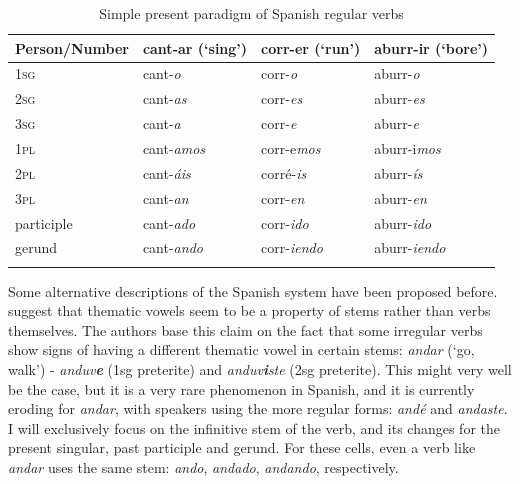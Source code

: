 \begin{table}
  \centering
  \begin{tabular}{llll}
    \lsptoprule
    Person/Number & cant-ar (`sing') & corr-er (`run')     & aburr-ir (`bore')    \\
    \midrule
    \textsc{1sg}           & cant-\textit{o}           & corr-\textit{o}     & aburr-\textit{o}     \\
    \textsc{2sg}           & cant-\textit{as}          & corr-\textit{es}    & aburr-\textit{es}    \\
    \textsc{3sg}           & cant-\textit{a}           & corr-\textit{e}     & aburr-\textit{e}     \\
    \textsc{1pl}           & cant-\textit{amos}        & corr-e\textit{mos}  & aburr-i\textit{mos}  \\
    \textsc{2pl}           & cant-\textit{áis}         & corré-\textit{is}   & aburr-\textit{ís}    \\
    \textsc{3pl}           & cant-\textit{an}          & corr-\textit{en}    & aburr-\textit{en}    \\
    participle    & cant-\textit{ado}         & corr-\textit{ido}   & aburr-\textit{ido}   \\
    gerund        & cant-\textit{ando}        & corr-\textit{iendo} & aburr-\textit{iendo} \\
    \lspbottomrule
  \end{tabular}\caption{Simple present paradigm of Spanish regular verbs}\label{tab:sp-verb-paradigm}
\end{table}

Some alternative descriptions of the Spanish system have been proposed before. \textcite{Boye.2006} suggest that thematic vowels seem to be a property of stems rather than verbs themselves. The authors base this claim on the fact that some irregular verbs show signs of having a different thematic vowel in certain stems: \textit{andar} (`go, walk') - \textit{anduv\textbf{e}} (1sg preterite) and \textit{anduv\textbf{i}ste} (2sg preterite). This might very well be the case, but it is a very  rare phenomenon in Spanish, and it is currently eroding for \textit{andar}, with speakers using the more regular forms: \textit{andé} and \textit{andaste}. I will exclusively focus on the infinitive stem of the verb, and its changes for the present singular, past participle and gerund. For these cells, even a verb like \textit{andar} uses the same stem: \textit{ando}, \textit{andado}, \textit{andando}, respectively.

